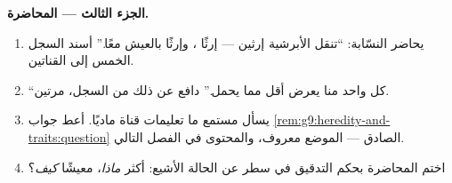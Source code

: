 \begin{problem}
\medskip\noindent\textbf{الجزء الثالث --- المحاضرة.}
\begin{enumerate}[resume]
  \item يحاضر النسّابة: ``تنقل الأبرشية إرثين --- إرثًا
        ، وإرثًا بالعيش معًا.'' أسند  السجل
        الخمس إلى القناتين.
  \item ``كل واحد منا يعرض أقل مما يحمل.'' دافع عن ذلك
        من السجل، مرتين.
  \item يسأل مستمع ما تعليمات قناة  ماديًا. أعط
        جواب \cref{rem:g9:heredity-and-traits:question}
        الصادق --- الموضع معروف، والمحتوى في الفصل
        التالي.
  \item اختم المحاضرة بحكم التدقيق في سطر عن الحالة
        الأشيع: أكثر  \emph{ماذا}، معيشًا
        \emph{كيف}؟
\end{enumerate}
\end{problem}
